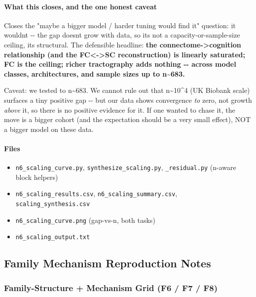 \paragraph{What this closes, and the one honest caveat}\label{what-this-closes-and-the-one-honest-caveat}

Closes the "maybe a bigger model / harder tuning would find it" question: it wouldn\textquotesingle t -\/- the gap doesn\textquotesingle t grow with data, so it\textquotesingle s not a capacity-or-sample-size ceiling, it\textquotesingle s structural. The defensible headline: \textbf{the connectome-\textgreater cognition relationship (and the FC\textless-\textgreater SC reconstruction) is linearly saturated; FC is the ceiling; richer tractography adds nothing -\/- across model classes, architectures, and sample sizes up to n\textasciitilde683.}

Caveat: we tested to n\textasciitilde683. We cannot rule out that n\textasciitilde10\^{}4 (UK Biobank scale) surfaces a tiny positive gap -\/- but our data shows convergence \emph{to} zero, not growth \emph{above} it, so there is no positive evidence for it. If one wanted to chase it, the move is a bigger cohort (and the expectation should be a very small effect), NOT a bigger model on these data.

\paragraph{Files}\label{files-5}

\begin{itemize}
\tightlist
\item
  \texttt{n6\_scaling\_curve.py}, \texttt{synthesize\_scaling.py}, \texttt{\_residual.py} (n-aware block helpers)
\item
  \texttt{n6\_scaling\_results.csv}, \texttt{n6\_scaling\_summary.csv}, \texttt{scaling\_synthesis.csv}
\item
  \texttt{n6\_scaling\_curve.png} (gap-vs-n, both tasks)
\item
  \texttt{n6\_scaling\_output.txt}
\end{itemize}

\subsection{Family Mechanism Reproduction Notes}\label{family-mechanism-reproduction-notes}

\subsubsection{Family-Structure + Mechanism Grid (F6 / F7 / F8)}\label{family-structure--mechanism-grid-f6--f7--f8}

